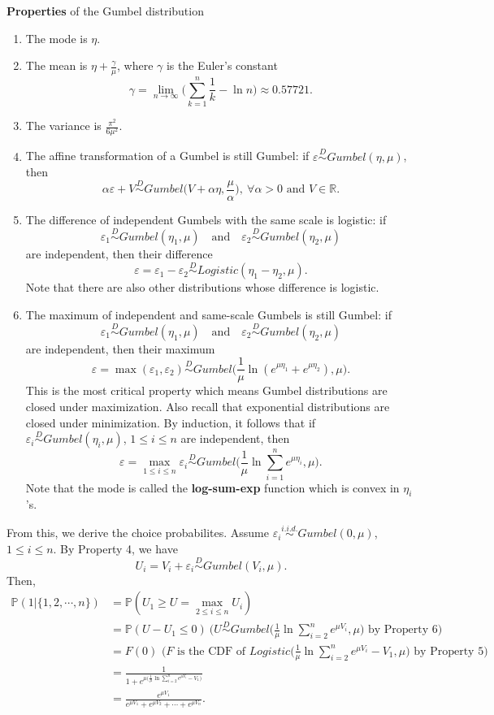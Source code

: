 \documentclass[11pt]{article}
\newcommand{\R}{\mathbb{R}}
\newcommand{\p}{\mathbb{P}}
\begin{document}
\begin{tcolorbox}
\textbf{Properties} of the Gumbel distribution 
\begin{enumerate}
\item The mode is $\eta$.
\item The mean is $\eta+\displaystyle\frac{\gamma}{\mu}$, where $\gamma$ is the Euler's constant
$$\gamma=\lim_{n\to\infty}\bigg(\sum_{k=1}^n\frac{1}{k}-\ln n\bigg)\approx0.57721.$$
\item The variance is $\displaystyle\frac{\pi^2}{6\mu^2}$.
\item The affine transformation of a Gumbel is still Gumbel: if $\varepsilon\overset{D}\sim Gumbel(\eta,\mu)$, then
$$\alpha\varepsilon+V\overset{D}\sim Gumbel\Big(V+\alpha\eta,\frac{\mu}{\alpha}\Big),\ \forall\alpha>0\text{ and }V\in\R.$$
\item The difference of independent Gumbels with the same scale is logistic: if  
$$\varepsilon_1\overset{D}\sim Gumbel(\eta_1,\mu)\quad\text{and}\quad\varepsilon_2\overset{D}\sim Gumbel(\eta_2,\mu)$$
are independent, then their difference $$\varepsilon=\varepsilon_1-\varepsilon_2\overset{D}\sim Logistic(\eta_1-\eta_2,\mu).$$ Note that there are also other distributions whose difference is logistic.
\item The maximum of independent and same-scale Gumbels is still Gumbel: if 
$$\varepsilon_1\overset{D}\sim Gumbel(\eta_1,\mu)\quad\text{and}\quad\varepsilon_2\overset{D}\sim Gumbel(\eta_2,\mu)$$
are independent, then their maximum
$$\varepsilon=\max(\varepsilon_1,\varepsilon_2)\overset{D}\sim Gumbel\Big(\frac{1}{\mu}\ln(e^{\mu\eta_1}+e^{\mu\eta_2}),\mu\Big).$$
This is the most critical property which means Gumbel distributions are closed under maximization. Also recall that exponential distributions are closed under minimization. By induction, it follows that if $\varepsilon_i\overset{D}\sim Gumbel(\eta_i,\mu)$, $1\leq i\leq n$ are independent, then
$$\varepsilon=\max_{1\leq i\leq n}\varepsilon_i\overset{D}\sim Gumbel\Big(\frac{1}{\mu}\ln\sum_{i=1}^ne^{\mu\eta_i},\mu\Big).$$
Note that the mode is called the \textbf{log-sum-exp} function which is convex in $\eta_i$'s.
\end{enumerate}
\end{tcolorbox}
\noindent From this, we derive the choice probabilites. Assume $\varepsilon_i\overset{i.i.d.}\sim Gumbel(0,\mu)$, $1\leq i\leq n$. By Property 4, we have
$$U_i=V_i+\varepsilon_i\overset{D}\sim Gumbel(V_i,\mu).$$
Then,
\begin{align*}
\p(1|\{1,2,\cdots,n\})&=\p(U_1\geq U=\max_{2\leq i\leq n}U_i)
\\&=\p(U-U_1\leq 0)\ (U\overset{D}\sim Gumbel\Big(\frac{1}{\mu}\ln\sum_{i=2}^ne^{\mu V_i},\mu\Big)\text{ by Property 6)}\\&=F(0)\text{ ($F$ is the CDF of }Logistic\Big(\frac{1}{\mu}\ln\sum_{i=2}^ne^{\mu V_i}-V_1,\mu\Big)\text{ by Property 5)}\\&=\frac{1}{1+e^{\mu\Big(\displaystyle\frac{1}{\mu}\ln\sum_{i=2}^ne^{\mu V_i}-V_1\Big)}}\\&=\frac{e^{\mu V_1}}{e^{\mu V_1}+e^{\mu V_2}+\cdots+e^{\mu V_n}}.
\end{align*}
\end{document}
